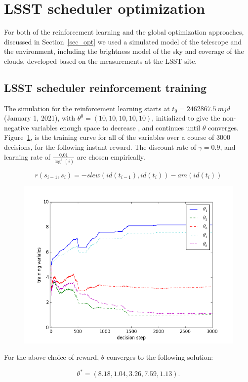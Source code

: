 \documentclass[12pt]{aastex62}
\theoremstyle{definition}
\begin{document}
\section{LSST scheduler optimization}\label{sec_lsst_opt}

For both of the reinforcement learning and the global optimization approaches, discussed in Section~\ref{sec_opt} we used a simulated model of the telescope and the environment, including the brightness model of the sky and coverage of the clouds, developed based on the measurements at the LSST site. 


\subsection{LSST scheduler reinforcement training}

The simulation for the reinforcement learning starts at $t_0 = 2462867.5~mjd$ (January 1, 2021), with $\theta^0 = (10,10,10,10,10)$, initialized to give the non-negative variables enough space to decrease , and continues until $\theta$ converges. Figure~\ref{fig_theta_conv}, is the training curve for all of the variables over a course of 3000 decisions, for the following instant reward. The discount rate of $\gamma = 0.9$, and learning rate of $\frac{0.01}{\log^3(i)}$ are chosen empirically. 

\begin{equation}
r(s_{i-1}, s_i) = -slew(id(t_{i-1}), id(t_{i})) - am(id(t_i))
\end{equation}

\begin{figure}[h!]
\begin{center}
\includegraphics[width=0.4\linewidth]{Figures/TDcurve.png}
\end{center}
\caption{}
\label{fig_theta_conv}
\end{figure}

For the above choice of reward, $\theta$ converges to the following solution:

\begin{equation*}
\theta^* = (8.18,  1.04,  3.26,  7.59,  1.13).
\end{equation*}
\end{document}
